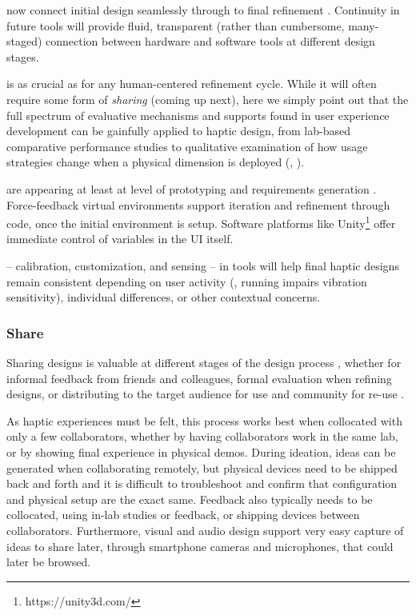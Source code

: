 now connect initial design seamlessly through to final refinement \cite{schneider2015tactile,Schneider2016macaron}.
Continuity in future tools will provide fluid, transparent (rather than cumbersome, many-staged) connection between hardware and software tools at different design stages.

 is as crucial as for any human-centered refinement cycle. While it will often require some form of \textit{sharing} (coming up next), here we simply point out that the full spectrum of evaluative mechanisms and supports found in user experience development can be gainfully applied to haptic design, from lab-based comparative performance studies to qualitative examination of how usage strategies change when a physical dimension is deployed (\eg, \cite{minaker:2016:EH:handson}).

 are appearing at least at level of prototyping and requirements generation \cite{SchneiderAsiaHaptics2014,Seifi2014}. 
Force-feedback virtual environments support iteration and refinement through code, once the initial environment is setup.
Software platforms like Unity\footnote{https://unity3d.com/} offer immediate control of variables in the UI itself.

 -- calibration, customization, and sensing -- in tools will help final haptic designs remain consistent depending on user activity (\eg, running impairs vibration sensitivity), individual differences, or other contextual concerns.

%
%
\subsubsection{Share} 
Sharing designs is valuable at different stages of the design process \cite{Kulkarni2012}, whether for informal feedback from friends and colleagues, formal evaluation when refining designs, or distributing to the target audience for use and community for re-use \cite{Shneiderman2007}.

As haptic experiences must be felt, this process works best when collocated with only a few collaborators, whether by having collaborators work in the same lab, or by showing final experience in physical demos.
During ideation, ideas can be generated when collaborating remotely, but physical devices need to be shipped back and forth and it is difficult to troubleshoot and confirm that configuration and physical setup are the exact same.
Feedback also typically needs to be collocated, using in-lab studies or feedback, or shipping devices between collaborators.
Furthermore, visual and audio design support very easy capture of ideas to share later, through smartphone cameras and microphones, that could later be browsed.


